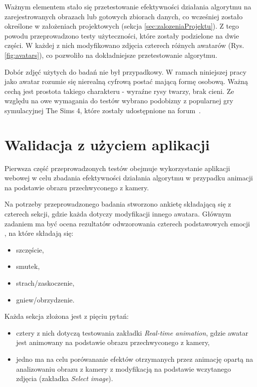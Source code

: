 Ważnym elementem stało się przetestowanie efektywności działania algorytmu na zarejestrowanych obrazach lub gotowych zbiorach danych, co wcześniej zostało określone w założeniach projektowych (sekcja \ref{sec:zalozeniaProjektu}). Z tego powodu przeprowadzono testy użyteczności, które zostały podzielone na dwie części. W każdej z nich modyfikowano zdjęcia czterech różnych awatarów (Rys. \ref{fig:avatars}), co pozwoliło na dokładniejsze przetestowanie algorytmu.

Dobór zdjęć użytych do badań nie był przypadkowy. W ramach niniejszej pracy jako awatar rozumie się nierealną cyfrową postać mającą formę osobową. Ważną cechą jest prostota takiego charakteru - wyraźne rysy twarzy, brak cieni. Ze względu na owe wymagania do testów wybrano podobizny z popularnej gry symulacyjnej The Sims 4, które zostały udostępnione na forum~\cite{avatars}.


\section{Walidacja z użyciem aplikacji}
Pierwsza część przeprowadzonych testów obejmuje wykorzystanie aplikacji webowej w celu zbadania efektywności działania algorytmu w przypadku animacji na podstawie obrazu przechwyconego z kamery. 

Na potrzeby przeprowadzonego badania stworzono ankietę składającą się z czterech sekcji, gdzie każda dotyczy modyfikacji innego awatara. Głównym zadaniem ma być ocena rezultatów odwzorowania czterech podstawowych emocji \cite{emotions}, na które składają się:

\begin{itemize}
    \item szczęście,
    \item smutek,
    \item strach/zaskoczenie,
    \item gniew/obrzydzenie.
\end{itemize}

Każda sekcja złożona jest z pięciu pytań:
\begin{itemize}
    \item cztery z nich dotyczą testowania zakładki \textit{Real-time animation}, gdzie awatar jest animowany na podstawie obrazu przechwyconego z kamery,
    \item jedno ma na celu porówananie efektów otrzymanych przez animację opartą na analizowaniu obrazu z kamery z modyfikacją na podstawie wczytanego zdjęcia (zakładka \textit{Select image}).
\end{itemize}

